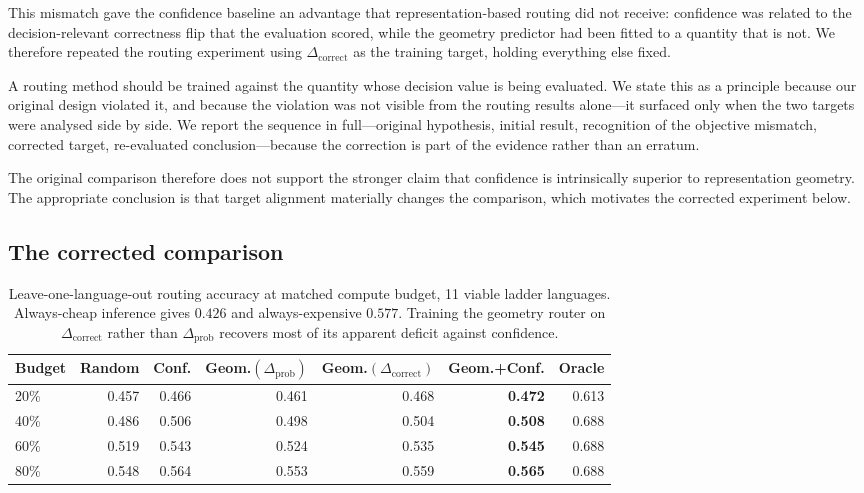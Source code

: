 \documentclass[11pt]{article}
\newcommand{\claim}[1]{#1}   %
\begin{document}
This mismatch gave the confidence baseline an advantage that representation-based
routing did not receive: confidence was related to the decision-relevant
correctness flip that the evaluation scored, while the geometry predictor had
been fitted to a quantity that is not. We therefore repeated the routing
experiment using $\Delta_{\mathrm{correct}}$ as the training target, holding
everything else fixed.

\claim{A routing method should be trained against the quantity whose decision
value is being evaluated.} We state this as a principle because our original
design violated it, and because the violation was not visible from the routing
results alone---it surfaced only when the two targets were analysed side by side.
We report the sequence in full---original hypothesis, initial result, recognition
of the objective mismatch, corrected target, re-evaluated conclusion---because
the correction is part of the evidence rather than an erratum.

\claim{The original comparison therefore does not support the stronger claim that
confidence is intrinsically superior to representation geometry. The appropriate
conclusion is that target alignment materially changes the comparison}, which
motivates the corrected experiment below.

\subsection{The corrected comparison}
\label{sec:corrected}

\begin{table}[t]
\centering
\small
\begin{tabular}{lrrrrrr}
\toprule
Budget & Random & Conf. & Geom.$(\Delta_{\mathrm{prob}})$
& Geom.$(\Delta_{\mathrm{correct}})$ & Geom.+Conf. & Oracle \\
\midrule
20\% & 0.457 & 0.466 & 0.461 & 0.468 & \textbf{0.472} & 0.613 \\
40\% & 0.486 & 0.506 & 0.498 & 0.504 & \textbf{0.508} & 0.688 \\
60\% & 0.519 & 0.543 & 0.524 & 0.535 & \textbf{0.545} & 0.688 \\
80\% & 0.548 & 0.564 & 0.553 & 0.559 & \textbf{0.565} & 0.688 \\
\bottomrule
\end{tabular}
\caption{Leave-one-language-out routing accuracy at matched compute budget,
11 viable ladder languages. Always-cheap inference gives $0.426$ and
always-expensive $0.577$. Training the geometry router on
$\Delta_{\mathrm{correct}}$ rather than $\Delta_{\mathrm{prob}}$ recovers most of
its apparent deficit against confidence.}
\label{tab:router}
\end{table}
\end{document}
